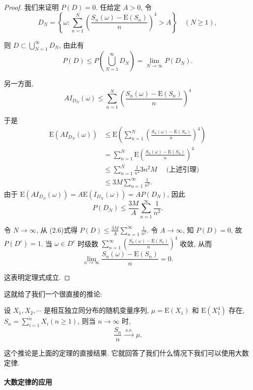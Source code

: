 {\begin{proof}
我们来证明 $P(D)=0$.
任给定 $A>0$, 令
$$
D_N=\left\{\omega: \sum_{n=1}^N\left(\frac{S_n(\omega)-\mathrm{E}\left(S_n\right)}{n}\right)^4>A\right\} \quad(N \geqslant 1),
$$

则 $D \subset \bigcup_{N=1}^{\infty} D_N$, 由此有
$$
P(D) \leq P\left(\bigcup_{N=1}^{\infty} D_N\right)=\lim _{N \rightarrow \infty} P\left(D_N\right) .
$$

另一方面, 
$$
A I_{D_N}(\omega) \leq \sum_{n=1}^N\left(\frac{S_n(\omega)-\mathrm{E}\left(S_n\right)}{n}\right)^4
$$

于是
$$
\begin{aligned}
\mathrm{E}\left(A I_{D_N}(\omega)\right) & \leq \mathrm{E}\left(\sum_{n=1}^N\left(\frac{S_n(\omega)-\mathrm{E}\left(S_n\right)}{n}\right)^4\right) \\
& =\sum_{n=1}^N \mathrm{E}\left(\frac{S_n(\omega)-\mathrm{E}\left(S_n\right)}{n}\right)^4 \\
& \leq \sum_{n=1}^N \frac{1}{n^4} 3 n^2 M \quad\text { (上述引理) } \\
& \leq 3 M \sum_{n=1}^{\infty} \frac{1}{n^2} .
\end{aligned}
$$
由于 $\mathrm{E}\left(A I_{D_N}(\omega)\right)=A \mathrm{E}\left(I_{D_N}(\omega)\right)=A P\left(D_N\right)$, 因此
$$
P\left(D_N\right) \leq \frac{3 M}{A} \sum_{n=1}^{\infty} \frac{1}{n^2} .
$$

令 $N \rightarrow \infty$, 从 (2.6)式得 $P(D) \leq \frac{3 M}{A} \sum_{n=1}^{\infty} \frac{1}{n^2}$. 令 $A \rightarrow \infty$, 知 $P(D)=0$, 故
$P\left(D^c\right)=1$. 当 $\omega \in D^c$ 时级数 $\sum_{n=1}^{\infty}\left(\frac{S_n(\omega)-\mathrm{E}\left(S_n\right)}{n}\right)^4$ 收敛, 从而
$$
\lim _{n \rightarrow \infty} \frac{S_n(\omega)-\mathrm{E}\left(S_n\right)}{n}=0 .
$$

这表明定理式成立.
\end{proof}
}

这就给了我们一个很直接的推论: 
\begin{corollary}
    设 $X_1, X_2, \cdots$ 是相互独立同分布的随机变量序列, $\mu=\mathrm{E}\left(X_1\right)$ 和 $\mathrm{E}\left(X_1^4\right)$ 存在, $S_n=\sum_{i=1}^n X_i(n \geqslant 1)$, 则当 $n \rightarrow \infty$ 时,
$$
\frac{S_n}{n} \stackrel{\text { a.s. }}{\longrightarrow} \mu .
$$
\end{corollary}

这个推论是上面的定理的直接结果. 它就回答了我们什么情况下我们可以使用大数定律. 

\paragraph{大数定律的应用}

